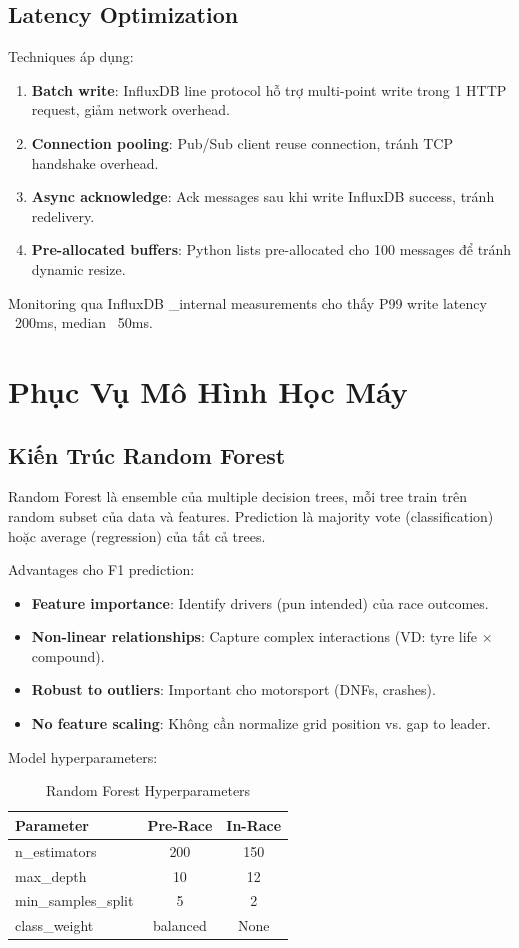 \documentclass[conference,10pt]{IEEEtran}
\begin{document}
\subsection{Latency Optimization}

Techniques áp dụng:
\begin{enumerate}
    \item \textbf{Batch write}: InfluxDB line protocol hỗ trợ multi-point write trong 1 HTTP request, giảm network overhead.
    \item \textbf{Connection pooling}: Pub/Sub client reuse connection, tránh TCP handshake overhead.
    \item \textbf{Async acknowledge}: Ack messages sau khi write InfluxDB success, tránh redelivery.
    \item \textbf{Pre-allocated buffers}: Python lists pre-allocated cho 100 messages để tránh dynamic resize.
\end{enumerate}

Monitoring qua InfluxDB \_internal measurements cho thấy P99 write latency ~200ms, median ~50ms.

\section{Phục Vụ Mô Hình Học Máy}

\subsection{Kiến Trúc Random Forest}

Random Forest là ensemble của multiple decision trees, mỗi tree train trên random subset của data và features. Prediction là majority vote (classification) hoặc average (regression) của tất cả trees.

Advantages cho F1 prediction:
\begin{itemize}
    \item \textbf{Feature importance}: Identify drivers (pun intended) của race outcomes.
    \item \textbf{Non-linear relationships}: Capture complex interactions (VD: tyre life × compound).
    \item \textbf{Robust to outliers}: Important cho motorsport (DNFs, crashes).
    \item \textbf{No feature scaling}: Không cần normalize grid position vs. gap to leader.
\end{itemize}

Model hyperparameters:
\begin{table}[h]
\centering
\small
\begin{tabular}{@{}lcc@{}}
\toprule
\textbf{Parameter} & \textbf{Pre-Race} & \textbf{In-Race} \\
\midrule
n\_estimators & 200 & 150 \\
max\_depth & 10 & 12 \\
min\_samples\_split & 5 & 2 \\
class\_weight & balanced & None \\
\bottomrule
\end{tabular}
\caption{Random Forest Hyperparameters}
\end{table}
\end{document}
